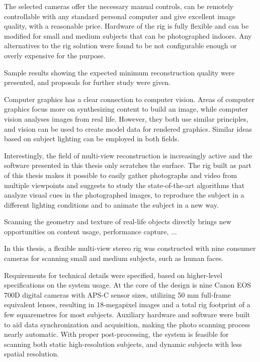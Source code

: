 The selected cameras offer the necessary manual controls, can be remotely controllable with any standard personal computer and give excellent image quality, with a reasonable price.
Hardware of the rig is fully flexible and can be modified for small and medium subjects that can be photographed indoors.
Any alternatives to the rig solution were found to be not configurable enough or overly expensive for the purpose.

Sample results showing the expected minimum reconstruction quality were presented, and proposals for further study were given.

Computer graphics has a clear connection to computer vision.
Areas of computer graphics focus more on synthesizing content to build an image, while computer vision analyses images from real life.
However, they both use similar principles, and vision can be used to create model data for rendered graphics.
Similar ideas based on subject lighting can be employed in both fields.

Interestingly, the field of multi-view reconstruction is increasingly active and the software presented in this thesis only scratches the surface.
The rig built as part of this thesis makes it possible to easily gather photographs and video from multiple viewpoints and suggests to study the state-of-the-art algorithms that analyze visual cues in the photographed images, to reproduce the subject in a different lighting conditions and to animate the subject in a new way.

Scanning the geometry and texture of real-life objects directly brings new opportunities on content usage, performance capture, ...

In this thesis, a flexible multi-view stereo rig was constructed with nine consumer cameras for scanning small and medium subjects, such as human faces.

Requirements for technical details were specified, based on higher-level specifications on the system usage.
At the core of the design is nine Canon EOS 700D digital cameras with APS-C sensor sizes, utilizing 50 mm full-frame equivalent lenses, resulting in 18-megapixel images and a total rig footprint of a few squaremetres for most subjects.
Auxiliary hardware and software were built to aid data synchronization and acquisition, making the photo scanning process nearly automatic.
With proper post-processing, the system is feasible for scanning both static high-resolution subjects, and dynamic subjects with less spatial resolution.

